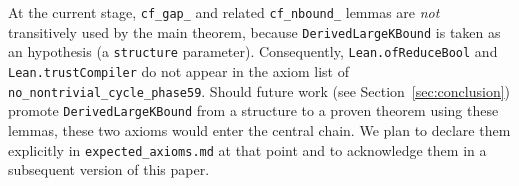 \begin{remark}
At the current stage, \texttt{cf\_gap\_\*} and related
\texttt{cf\_nbound\_\*} lemmas are \emph{not} transitively used by the main
theorem, because \texttt{DerivedLargeKBound} is taken as an hypothesis
(a \texttt{structure} parameter). Consequently,
\texttt{Lean.ofReduceBool} and \texttt{Lean.trustCompiler} do not appear in
the axiom list of \texttt{no\_nontrivial\_cycle\_phase59}. Should future
work (see Section~\ref{sec:conclusion}) promote
\texttt{DerivedLargeKBound} from a structure to a proven theorem using
these lemmas, these two axioms would enter the central chain. We plan to
declare them explicitly in \texttt{expected\_axioms.md} at that point and
to acknowledge them in a subsequent version of this paper.
\end{remark}

